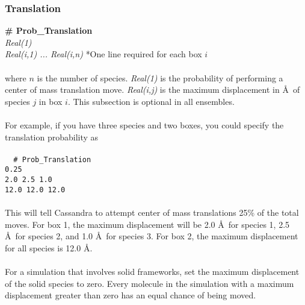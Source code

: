 \subsubsection{Translation}
{\bf \# Prob\_Translation}\\
{\it Real(1)} \\
{\it Real(i,1) ... Real(i,n) } *One line required for each box $i$ \\ \\
%
where $n$ is the number of species. 
{\it Real(1)} is the probability of performing a center of mass translation move.
{\it Real(i,j)} is the maximum displacement in \AA\ of species $j$ in box $i$.
This subsection is optional in all ensembles. \\ \\
%
For example, if you have three species and two boxes, you could specify
the translation probability as \\ \\
\texttt{
{ \# Prob\_Translation} \\
 0.25 \\
2.0 2.5 1.0\\
12.0 12.0 12.0} 
\\ \\
This will tell Cassandra to attempt center of mass translations 25\%
of the total moves. For box 1, the maximum displacement will be 2.0 \AA\ for
species 1, 2.5 \AA\ for species 2, and 1.0 \AA\ for species 3. 
For box 2, the maximum displacement for all species is 12.0 \AA . \\ \\
%
For a simulation that involves solid frameworks, 
set the maximum displacement of the solid species to zero.
Every molecule in the simulation with a maximum displacement greater than zero 
has an equal chance of being moved.
%
%
%
%
%
%
%
